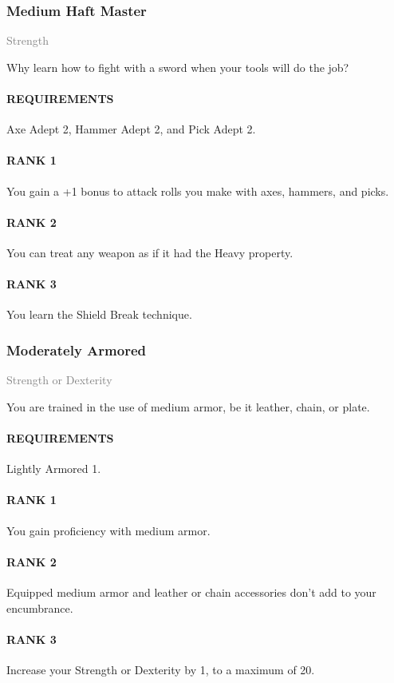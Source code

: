 \subsubsection{Medium Haft Master} \label{feat::mediumhaftmaster}
\small{\textcolor{gray}{Strength}}

\normalsize
Why learn how to fight with a sword when your tools will do the job?
\paragraph{REQUIREMENTS} Axe Adept 2, Hammer Adept 2, and Pick Adept 2.
\paragraph{RANK 1} You gain a +1 bonus to attack rolls you make with axes, hammers, and picks.
\paragraph{RANK 2} You can treat any weapon as if it had the Heavy property.
\paragraph{RANK 3} You learn the Shield Break technique.

\subsubsection{Moderately Armored} \label{feat::moderatelyarmored}
\small{\textcolor{gray}{Strength or Dexterity}}

\normalsize
You are trained in the use of medium armor, be it leather, chain, or plate.
\paragraph{REQUIREMENTS} Lightly Armored 1.
\paragraph{RANK 1} You gain proficiency with medium armor.
\paragraph{RANK 2} Equipped medium armor and leather or chain accessories don't add to your encumbrance.
\paragraph{RANK 3} Increase your Strength or Dexterity by 1, to a maximum of 20.

